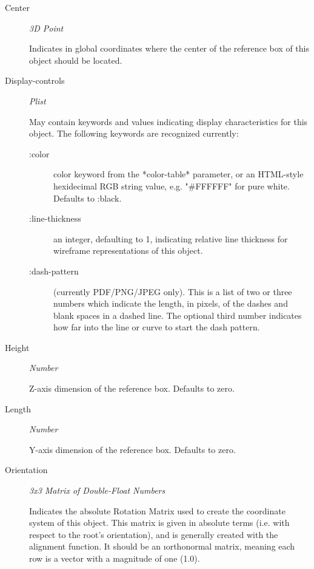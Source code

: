 \documentclass [11pt]{book}
\begin{document}
\begin{itemize}
\begin{description}
\item [Center]
\emph{3D Point}

 Indicates in global coordinates where the center of the reference
box of this object should be located.




\item [Display-controls]
\emph{Plist}

 May contain keywords and values indicating display characteristics for
this object. The following keywords are recognized currently:



\begin{description}


\item[:color]
 color keyword from the *color-table* parameter, or an HTML-style hexidecimal
RGB string value, e.g. "\#FFFFFF" for pure white. Defaults to :black.


\item[:line-thickness]
 an integer, defaulting to 1, indicating relative line thickness for wireframe
representations of this object.


\item[:dash-pattern]
(currently PDF/PNG/JPEG only). This is a list of two or three numbers which indicate the length,
in pixels, of the dashes and blank spaces in a dashed line. The optional third number
indicates how far into the line or curve to start the dash pattern.

\end{description}





\item [Height]
\emph{Number}

 Z-axis dimension of the reference box. Defaults to zero.




\item [Length]
\emph{Number}

 Y-axis dimension of the reference box. Defaults to zero.




\item [Orientation]
\emph{3x3 Matrix of Double-Float Numbers}

 Indicates the absolute Rotation Matrix used to create
the coordinate system of this object. This matrix is given in absolute terms (i.e. with
respect to the root's orientation), and is generally created with the alignment function.
It should be an 
\i{orthonormal} matrix, meaning each row is a vector with a magnitude
of one (1.0).





\end{description}
\end{itemize}
\end{document}
